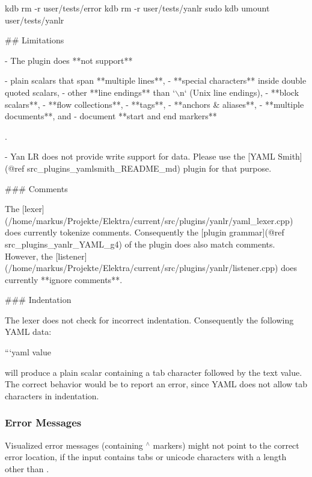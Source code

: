 kdb rm -\/r user/tests/error kdb rm -\/r user/tests/yanlr sudo kdb umount user/tests/yanlr 
\begin{DoxyCode}
## Limitations

- The plugin does **not support**

  - plain scalars that span **multiple lines**,
  - **special characters** inside double quoted scalars,
  - other **line endings** than `\(\backslash\)n` (Unix line endings),
  - **block scalars**,
  - **flow collections**,
  - **tags**,
  - **anchors & aliases**,
  - **multiple documents**, and
  - document **start and end markers**

  .

- Yan LR does not provide write support for data. Please use the [YAML Smith](@ref
       src\_plugins\_yamlsmith\_README\_md) plugin for that purpose.

### Comments

The [lexer](/home/markus/Projekte/Elektra/current/src/plugins/yanlr/yaml\_lexer.cpp) does currently tokenize
       comments. Consequently the [plugin grammar](@ref src\_plugins\_yanlr\_YAML\_g4) of the plugin does also match
       comments. However, the [listener](/home/markus/Projekte/Elektra/current/src/plugins/yanlr/listener.cpp) does
       currently **ignore comments**.

### Indentation

The lexer does not check for incorrect indentation. Consequently the following YAML data:



```yaml
        value
\end{DoxyCode}


will produce a plain scalar containing a tab character followed by the text {\ttfamily value}. The correct behavior would be to report an error, since Y\+A\+ML does not allow tab characters in indentation.

\subsubsection*{Error Messages}

Visualized error messages (containing {\ttfamily $^\wedge$} markers) might not point to the correct error location, if the input contains tabs or unicode characters with a length other than {}. 